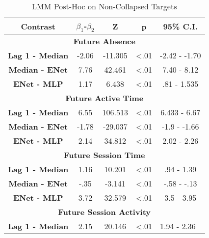 \begin{table}[h]
\centering
\caption{LMM Post-Hoc on Non-Collapsed Targets}
\label{exploded_post_hoc_33}
\begin{tabular}{ccccc}
\hline
\textbf{Contrast}  & \textbf{$\beta_1$-$\beta_2$} & \textbf{Z} & \textbf{p} & \textbf{95\% C.I.}                  \\ \hline
\multicolumn{5}{c}{\textbf{Future Absence}}                                                                         \\ \hline
\textbf{Lag 1 - Median} & -2.06                & -11.305     & \textless .01   & -2.42 - -1.70                     \\
\textbf{Median - ENet}           & 7.76                & 42.461     & \textless .01   & 7.40 - 8.12                     \\
\textbf{ENet - MLP}          & 1.17                & 6.438     & \textless .01   & .81 - 1.535                    \\ \hline
\multicolumn{5}{c}{\textbf{Future Active Time}}                                                                     \\ \hline
\textbf{Lag 1 - Median} & 6.55                & 106.513      & \textless .01  & 6.433 - 6.67                     \\
\textbf{Median - ENet}           & -1.78                & -29.037    & \textless .01  & -1.9 - -1.66                     \\
\textbf{ENet - MLP}          & 2.14                & 34.812     & \textless .01  & 2.02 - 2.26                     \\\hline
\multicolumn{5}{c}{\textbf{Future Session Time}}                                                                     \\ \hline
\textbf{Lag 1 - Median} & 1.16                & 10.201     & \textless .01  & .94 - 1.39                     \\
\textbf{Median - ENet}            & -.35                & -3.141     & \textless .01  & -.58 - -.13                     \\
\textbf{ENet - MLP}          & 3.72                & 32.579     & \textless .01  & 3.5 - 3.95                     \\ \hline
\multicolumn{5}{c}{\textbf{Future Session Activity}}                                                                 \\ \hline
\textbf{Lag 1 - Median} & 2.15                & 20.146     & \textless .01  & \multicolumn{1}{l}{1.94 - 2.36} \\

\end{tabular}
\end{table}

